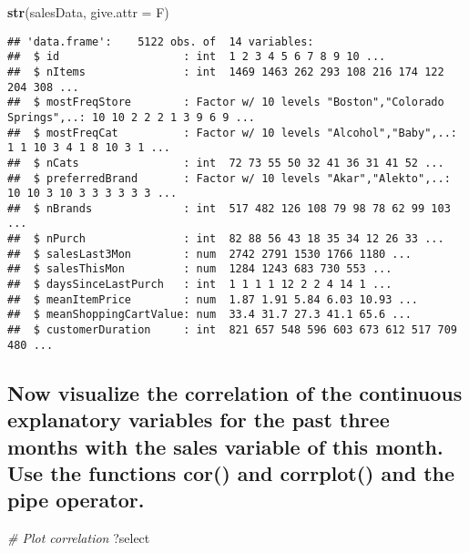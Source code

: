 \documentclass[
]{article}
\newenvironment{Shaded}{\begin{snugshade}}{\end{snugshade}}
\newcommand{\CommentTok}[1]{\textcolor[rgb]{0.56,0.35,0.01}{\textit{#1}}}
\newcommand{\DataTypeTok}[1]{\textcolor[rgb]{0.13,0.29,0.53}{#1}}
\newcommand{\KeywordTok}[1]{\textcolor[rgb]{0.13,0.29,0.53}{\textbf{#1}}}
\newcommand{\NormalTok}[1]{#1}
\begin{document}
\begin{Shaded}
\begin{Highlighting}[]
\KeywordTok{str}\NormalTok{(salesData, }\DataTypeTok{give.attr =}\NormalTok{ F)}
\end{Highlighting}
\end{Shaded}

\begin{verbatim}
## 'data.frame':    5122 obs. of  14 variables:
##  $ id                   : int  1 2 3 4 5 6 7 8 9 10 ...
##  $ nItems               : int  1469 1463 262 293 108 216 174 122 204 308 ...
##  $ mostFreqStore        : Factor w/ 10 levels "Boston","Colorado Springs",..: 10 10 2 2 2 1 3 9 6 9 ...
##  $ mostFreqCat          : Factor w/ 10 levels "Alcohol","Baby",..: 1 1 10 3 4 1 8 10 3 1 ...
##  $ nCats                : int  72 73 55 50 32 41 36 31 41 52 ...
##  $ preferredBrand       : Factor w/ 10 levels "Akar","Alekto",..: 10 10 3 10 3 3 3 3 3 3 ...
##  $ nBrands              : int  517 482 126 108 79 98 78 62 99 103 ...
##  $ nPurch               : int  82 88 56 43 18 35 34 12 26 33 ...
##  $ salesLast3Mon        : num  2742 2791 1530 1766 1180 ...
##  $ salesThisMon         : num  1284 1243 683 730 553 ...
##  $ daysSinceLastPurch   : int  1 1 1 1 12 2 2 4 14 1 ...
##  $ meanItemPrice        : num  1.87 1.91 5.84 6.03 10.93 ...
##  $ meanShoppingCartValue: num  33.4 31.7 27.3 41.1 65.6 ...
##  $ customerDuration     : int  821 657 548 596 603 673 612 517 709 480 ...
\end{verbatim}

\hypertarget{now-visualize-the-correlation-of-the-continuous-explanatory-variables-for-the-past-three-months-with-the-sales-variable-of-this-month.-use-the-functions-cor-and-corrplot-and-the-pipe-operator.}{%
\subsection{Now visualize the correlation of the continuous explanatory
variables for the past three months with the sales variable of this
month. Use the functions cor() and corrplot() and the pipe
operator.}\label{now-visualize-the-correlation-of-the-continuous-explanatory-variables-for-the-past-three-months-with-the-sales-variable-of-this-month.-use-the-functions-cor-and-corrplot-and-the-pipe-operator.}}

\begin{Shaded}
\begin{Highlighting}[]
\CommentTok{# Plot correlation}
\NormalTok{?select}
\end{Highlighting}
\end{Shaded}
\end{document}
